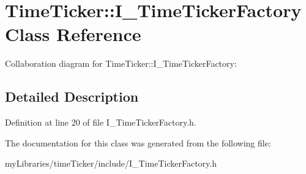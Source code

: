 \hypertarget{classTimeTicker_1_1I__TimeTickerFactory}{}\section{Time\+Ticker\+::I\+\_\+\+Time\+Ticker\+Factory Class Reference}
\label{classTimeTicker_1_1I__TimeTickerFactory}


Collaboration diagram for Time\+Ticker\+::I\+\_\+\+Time\+Ticker\+Factory\+:


\subsection{Detailed Description}


Definition at line 20 of file I\+\_\+\+Time\+Ticker\+Factory.\+h.



The documentation for this class was generated from the following file\+:\begin{DoxyCompactItemize}
\item 
my\+Libraries/time\+Ticker/include/I\+\_\+\+Time\+Ticker\+Factory.\+h\end{DoxyCompactItemize}
